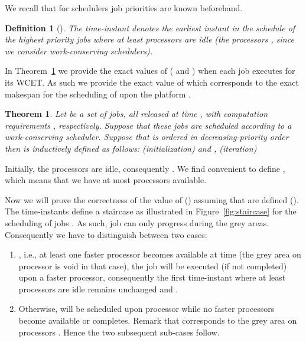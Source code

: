 \documentclass[10pt,english,a4paper]{article}
\newtheorem{theorem}{Theorem}
\newtheorem{definition}{\bf Definition}
\newenvironment{proof}[1][Proof]{\begin{trivlist}
\item[\hskip \labelsep {\bfseries #1}]}{\end{trivlist}}
\newtheorem{validity test}{Validity Test}
\newcommand{\fin}{\hfill{\small }}     \newcommand{\oh}[1]{\ensuremath{\mathcal{0}{(#1)}}} \def\thefootnote{\arabic{footnote}}
\begin{document}
We recall that for  schedulers job priorities are known beforehand. 

\begin{definition}[]\label{def:tij}
The time-instant  denotes the earliest instant in the schedule of the  highest priority jobs  where at least  processors are idle (the processors , since we consider work-conserving schedulers).
\end{definition}

In Theorem~\ref{theo3} we provide the exact values of  ( and ) when each job executes for its WCET. As such we provide the exact value of  which corresponds to the exact makespan for the scheduling of  upon the platform .

\begin{theorem}\label{theo3}
Let  be a set of  jobs, all released at time , with computation requirements , respectively. Suppose that these jobs are scheduled according to a work-conserving  scheduler. Suppose that  is ordered in decreasing-priority order then  is inductively defined as follows:
 (initialization)  and , (iteration) 

\end{theorem}

\begin{proof} 
Initially, the  processors are idle, consequently . We find convenient to define , which means that we have at most  processors available.

Now we will prove the correctness of the value of  () assuming that  are defined (). The time-instants  define a staircase as illustrated in Figure~\ref{fig:staircase} for the scheduling of jobs . As such, job  can only progress during the grey areas. Consequently we have to distinguish between two cases:
\begin{enumerate}
\item , i.e., at least one faster processor becomes available at time  (the grey area on processor  is void in that case), the job  will be executed (if not completed) upon a faster processor, consequently the first time-instant where at least  processors are idle remains unchanged and .

\item Otherwise,  will be scheduled upon processor  while no faster processors become available or  completes. Remark that  corresponds to the grey area on processors . Hence the two subsequent sub-cases follow.
\end{enumerate}
\fin
\end{proof}
\end{document}
